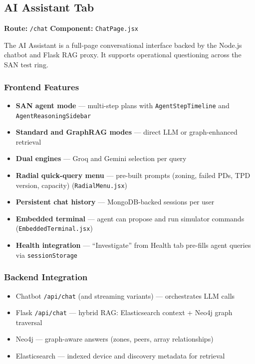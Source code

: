 \documentclass[11pt,a4paper]{article}
\begin{document}
\subsection{AI Assistant Tab}

\textbf{Route:} \texttt{/chat} \quad \textbf{Component:} \texttt{ChatPage.jsx}

The AI Assistant is a full-page conversational interface backed by the Node.js chatbot and Flask RAG proxy. It supports operational questioning across the SAN test ring.

\subsubsection{Frontend Features}

\begin{itemize}[leftmargin=1.5cm]
    \item \textbf{SAN agent mode} --- multi-step plans with \texttt{AgentStepTimeline} and \texttt{AgentReasoningSidebar}
    \item \textbf{Standard and GraphRAG modes} --- direct LLM or graph-enhanced retrieval
    \item \textbf{Dual engines} --- Groq and Gemini selection per query
    \item \textbf{Radial quick-query menu} --- pre-built prompts (zoning, failed PDs, TPD version, capacity) (\texttt{RadialMenu.jsx})
    \item \textbf{Persistent chat history} --- MongoDB-backed sessions per user
    \item \textbf{Embedded terminal} --- agent can propose and run simulator commands (\texttt{EmbeddedTerminal.jsx})
    \item \textbf{Health integration} --- ``Investigate'' from Health tab pre-fills agent queries via \texttt{sessionStorage}
\end{itemize}

\subsubsection{Backend Integration}

\begin{itemize}[leftmargin=1.5cm]
    \item Chatbot \texttt{/api/chat} (and streaming variants) --- orchestrates LLM calls
    \item Flask \texttt{/api/chat} --- hybrid RAG: Elasticsearch context + Neo4j graph traversal
    \item Neo4j --- graph-aware answers (zones, peers, array relationships)
    \item Elasticsearch --- indexed device and discovery metadata for retrieval
\end{itemize}
\end{document}
